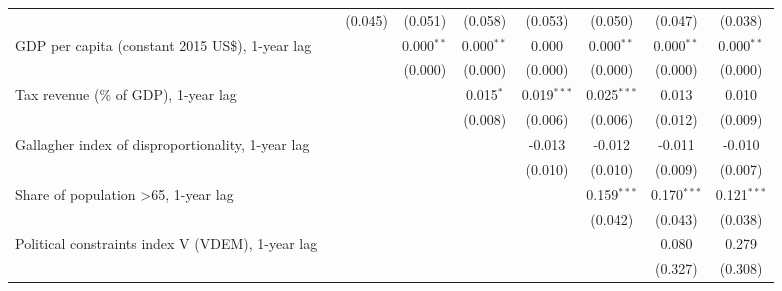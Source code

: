 \begin{table}[htbp]
\begin{tabular}{lcccccccc}
                                                                                &               & (0.045)       & (0.051)       & (0.058)       & (0.053)       & (0.050)       & (0.047)       & (0.038)\\   
      GDP per capita (constant 2015 US\$), 1-year lag                           &               &               & 0.000$^{**}$  & 0.000$^{**}$  & 0.000         & 0.000$^{**}$  & 0.000$^{**}$  & 0.000$^{**}$\\   
                                                                                &               &               & (0.000)       & (0.000)       & (0.000)       & (0.000)       & (0.000)       & (0.000)\\   
      Tax revenue (\% of GDP), 1-year lag                                       &               &               &               & 0.015$^{*}$   & 0.019$^{***}$ & 0.025$^{***}$ & 0.013         & 0.010\\   
                                                                                &               &               &               & (0.008)       & (0.006)       & (0.006)       & (0.012)       & (0.009)\\   
      Gallagher index of disproportionality, 1-year lag                         &               &               &               &               & -0.013        & -0.012        & -0.011        & -0.010\\   
                                                                                &               &               &               &               & (0.010)       & (0.010)       & (0.009)       & (0.007)\\   
      Share of population >65, 1-year lag                                       &               &               &               &               &               & 0.159$^{***}$ & 0.170$^{***}$ & 0.121$^{***}$\\   
                                                                                &               &               &               &               &               & (0.042)       & (0.043)       & (0.038)\\   
      Political constraints index V (VDEM), 1-year lag                          &               &               &               &               &               &               & 0.080         & 0.279\\   
                                                                                &               &               &               &               &               &               & (0.327)       & (0.308)\\   

\end{tabular}
\end{table}
